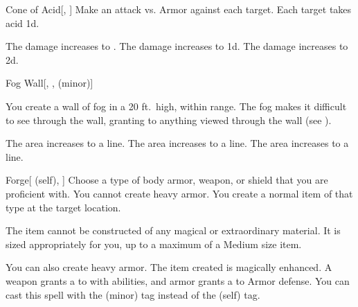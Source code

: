 \lowercase{\hypertarget{spell:Cone of Acid}{}}\label{spell:Cone of Acid}
\begin{freeability}[Rank 1]{\hypertarget{spell:Cone of Acid}{Cone of Acid}}[, ]
Make an attack vs. Armor against each target.
\hit Each target takes acid  \minus1d.

\rankline
{} The damage increases to .
 The damage increases to  \plus1d.
 The damage increases to  \plus2d.
\end{freeability}
\vspace{0.25em}



\lowercase{\hypertarget{spell:Fog Wall}{}}\label{spell:Fog Wall}
\begin{freeability}[Rank 1]{\hypertarget{spell:Fog Wall}{Fog Wall}}[, ,  (minor)]

You create a wall of fog in a 20 ft.\ high, \arealarge {} within \rngmed range.
The fog makes it difficult to see through the wall, granting  to anything viewed through the wall (see ).

\rankline
{} The area increases to a \arealarge line.
 The area increases to a \areahuge line.
 The area increases to a \areaext line.
\end{freeability}
\vspace{0.25em}



\lowercase{\hypertarget{spell:Forge}{}}\label{spell:Forge}
\begin{attuneability}[Rank 1]{\hypertarget{spell:Forge}{Forge}}[ (self), ]
Choose a type of body armor, weapon, or shield that you are proficient with.
You cannot create heavy armor.
You create a normal item of that type at the target location.

The item cannot be constructed of any magical or extraordinary material.
It is sized appropriately for you, up to a maximum of a Medium size item.

\rankline
{} You can also create heavy armor.
 The item created is magically enhanced.
A weapon grants a   to  with  abilities,
and armor grants a   to Armor defense.
 You can cast this spell with the  (minor) tag instead of the  (self) tag.
\end{attuneability}
\vspace{0.25em}



